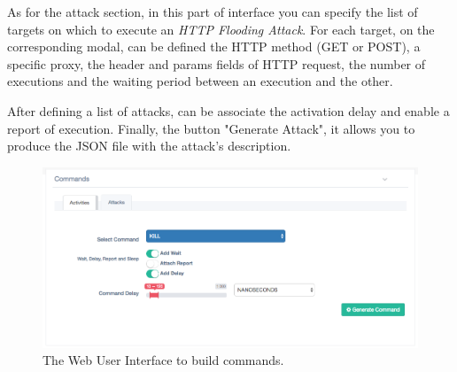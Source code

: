 As for the attack section, in this part of interface you can specify the list of targets on which to execute an \textit{HTTP Flooding Attack}. For each target, on the corresponding modal, can be defined the HTTP method (GET or POST), a specific proxy, the header and params fields of HTTP request, the number of executions and the waiting period between an execution and the other.

After defining a list of attacks, can be associate the activation delay and enable a report of execution. Finally, the button "Generate Attack", it allows you to produce the JSON file with the attack's description.

\begin{figure}[tp]
  \centering
  \includegraphics[scale=0.45]{./fig/commandsWUI.png}
  \caption{The Web User Interface to build commands.}
    \label{fig:commands-wui}
\end{figure}

